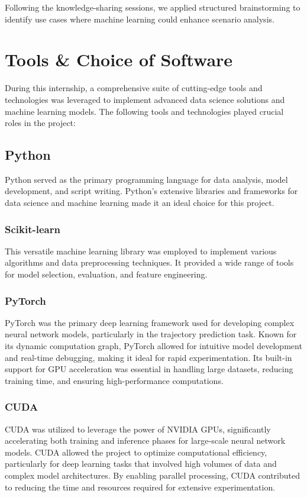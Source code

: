 \documentclass[12pt,a4paper]{report}
\begin{document}
Following the knowledge-sharing sessions, we applied structured brainstorming to identify use cases where machine learning could enhance scenario analysis. 

\section{Tools \& Choice of Software}

During this internship, a comprehensive suite of cutting-edge tools and technologies was leveraged to implement advanced data science solutions and machine learning models. The following tools and technologies played crucial roles in the project:


\subsection*{Python}

Python served as the primary programming language for data analysis, model development, and script writing. Python's extensive libraries and frameworks for data science and machine learning made it an ideal choice for this project. 


\subsubsection*{Scikit-learn}
This versatile machine learning library was employed to implement various algorithms and data preprocessing techniques. It provided a wide range of tools for model selection, evaluation, and feature engineering. 

\subsubsection*{PyTorch}
PyTorch was the primary deep learning framework used for developing complex neural network models, particularly in the trajectory prediction task. Known for its dynamic computation graph, PyTorch allowed for intuitive model development and real-time debugging, making it ideal for rapid experimentation. Its built-in support for GPU acceleration was essential in handling large datasets, reducing training time, and ensuring high-performance computations.
    
\subsubsection*{CUDA}
CUDA was utilized to leverage the power of NVIDIA GPUs, significantly accelerating both training and inference phases for large-scale neural network models. CUDA allowed the project to optimize computational efficiency, particularly for deep learning tasks that involved high volumes of data and complex model architectures. By enabling parallel processing, CUDA contributed to reducing the time and resources required for extensive experimentation.
\end{document}
